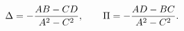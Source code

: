 \begin{equation}
\Delta=-{AB-CD\over A^2-C^2}, \qquad \Pi=-{AD-BC\over A^2-C^2}.\label{delta1}
\end{equation}

